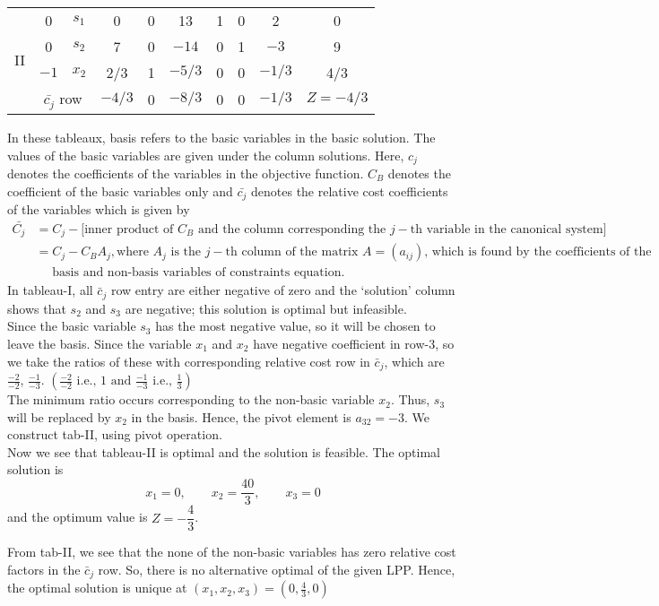 \documentclass[../main-sheet.tex]{subfiles}
\begin{document}
\begin{soln}
\begin{table}[H]
\begin{tabular}{cccccccccc}
            \midrule
            \multirow{4}[4]{*}{II} & 0     & $s_1$ & 0     & 0     & 13    & 1     & 0     & 2     & 0 \\
            & 0     & $s_2$ & 7     & 0     & $-14$   & 0     & 1     & $-3$    & 9 \\
            & $-1$    & $x_2$ & 2/3   & 1     & $-5/3$  & 0     & 0     & $-1/3$  & 4/3 \\
            \cmidrule{2-10}          & \multicolumn{2}{c}{$ \bar{c_j} $ row} & $-4/3$  & 0     & $-8/3$  & 0     & 0     & $-1/3$  & $Z=-4/3$ \\
            \bottomrule
      \end{tabular}%
    \label{tab:addlabel}%
  \end{table}%
  In these tableaux, basis refers to the basic variables in the basic solution. The values of the basic variables are given under the column solutions. Here, \(c_j\) denotes the coefficients of the variables in the objective function. \(C_B\) denotes the coefficient of the basic variables only and \(\bar{c_j}\) denotes the relative cost coefficients of the variables which is given by
  \begin{align*}
    \bar{C_j}&=C_j-\text{[inner product of \(C_B\) and the column corresponding the \(j-\)th variable in the canonical system]}\\
    &=C_j-C_BA_j,\text{where \(A_j\) is the \(j-\)th column of the matrix \(A=(a_{ij})\), which is found by the coefficients of the} \\
    & \quad\text{ basis and non-basis variables of constraints equation.}
\end{align*}
In tableau-I, all \(\bar{c}_j\) row entry are either negative of zero and the `solution' column shows that \(s_2\) and \(s_3\) are negative; this solution is optimal but infeasible.\\
Since the basic variable \(s_3\) has the most negative value, so it will be chosen to leave the basis. Since the variable \(x_1\) and \(x_2\) have negative coefficient in row-3, so we take the ratios of these with corresponding relative cost row in \(\bar{c}_j\), which are \(\frac{-2}{-2}\), \(\frac{-1}{-3}\). \(\left(\frac{-2}{-2}\text{ i.e., } 1 \text{ and }\frac{-1}{-3}\text{ i.e., }\frac{1}{3} \right)\)\\

The minimum ratio occurs corresponding to the non-basic variable \(x_2\). Thus, \(s_3\) will be replaced by \(x_2\) in the basis. Hence, the pivot element is \(a_{32}=-3\). We construct tab-II, using pivot operation.\\

Now we see that tableau-II is optimal and the solution is feasible. The optimal solution is
\[x_1=0,\qquad x_2=\frac{40}{3},\qquad x_3=0\]
and the optimum value is \(Z=-\dfrac{4}{3}\).

From tab-II, we see that the none of the non-basic variables has zero relative cost factors in the \(\bar{c}_j\) row. So, there is no alternative optimal of the given LPP. Hence, the optimal solution is unique at \((x_1,x_2,x_3)=(0,\frac{4}{3},0)\)
\end{soln}
\end{document}
